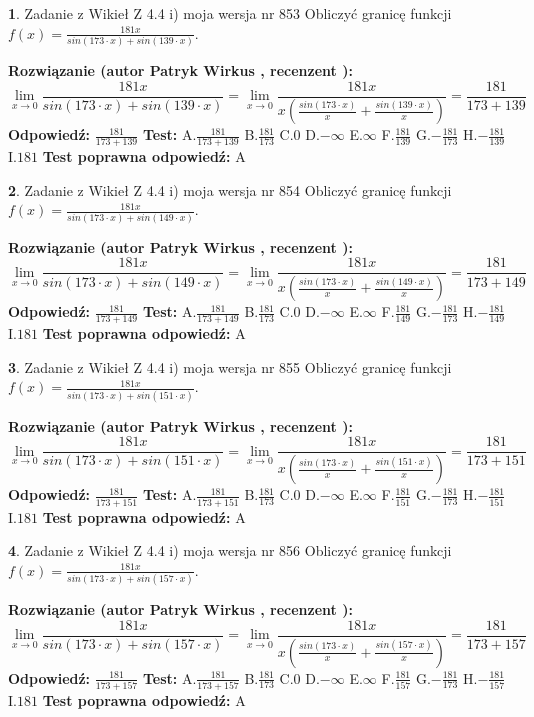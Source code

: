 \documentclass[12pt, a4paper]{article}
\theoremstyle{definition} %
\newtheorem{zad}{}
\newcommand{\zadStart}[1]{\begin{zad}#1\newline}
\newcommand{\zadStop}{\end{zad}}
\newcommand{\rozwStart}[2]{\noindent \textbf{Rozwiązanie (autor #1 , recenzent #2): }\newline}
\newcommand{\rozwStop}{\newline}
\newcommand{\odpStart}{\noindent \textbf{Odpowiedź:}\newline}
\newcommand{\odpStop}{\newline}
\newcommand{\testStart}{\noindent \textbf{Test:}\newline}
\newcommand{\testStop}{\newline}
\newcommand{\kluczStart}{\noindent \textbf{Test poprawna odpowiedź:}\newline}
\newcommand{\kluczStop}{\newline}
\begin{document}
\zadStart{Zadanie z Wikieł Z 4.4 i) moja wersja nr 853}
Obliczyć granicę funkcji $f(x)=\frac{181x}{sin(173\cdot x) +sin(139\cdot x)}$.
\zadStop
\rozwStart{Patryk Wirkus}{}
$$\lim\limits_{x\to 0}\frac{181x}{sin(173\cdot x) +sin(139\cdot x)}=\lim\limits_{x\to 0}\frac{181x}{x(\frac{sin(173\cdot x)}{x}+\frac{sin(139\cdot x)}{x})}=\frac{181}{173+139}$$
\rozwStop
\odpStart
$\frac{181}{173+139}$
\odpStop
\testStart
A.$\frac{181}{173+139}$
B.$\frac{181}{173}$
C.$0$
D.$-\infty$
E.$\infty$
F.$\frac{181}{139}$
G.$-\frac{181}{173}$
H.$-\frac{181}{139}$
I.$181$
\testStop
\kluczStart
A
\kluczStop



\zadStart{Zadanie z Wikieł Z 4.4 i) moja wersja nr 854}
Obliczyć granicę funkcji $f(x)=\frac{181x}{sin(173\cdot x) +sin(149\cdot x)}$.
\zadStop
\rozwStart{Patryk Wirkus}{}
$$\lim\limits_{x\to 0}\frac{181x}{sin(173\cdot x) +sin(149\cdot x)}=\lim\limits_{x\to 0}\frac{181x}{x(\frac{sin(173\cdot x)}{x}+\frac{sin(149\cdot x)}{x})}=\frac{181}{173+149}$$
\rozwStop
\odpStart
$\frac{181}{173+149}$
\odpStop
\testStart
A.$\frac{181}{173+149}$
B.$\frac{181}{173}$
C.$0$
D.$-\infty$
E.$\infty$
F.$\frac{181}{149}$
G.$-\frac{181}{173}$
H.$-\frac{181}{149}$
I.$181$
\testStop
\kluczStart
A
\kluczStop



\zadStart{Zadanie z Wikieł Z 4.4 i) moja wersja nr 855}
Obliczyć granicę funkcji $f(x)=\frac{181x}{sin(173\cdot x) +sin(151\cdot x)}$.
\zadStop
\rozwStart{Patryk Wirkus}{}
$$\lim\limits_{x\to 0}\frac{181x}{sin(173\cdot x) +sin(151\cdot x)}=\lim\limits_{x\to 0}\frac{181x}{x(\frac{sin(173\cdot x)}{x}+\frac{sin(151\cdot x)}{x})}=\frac{181}{173+151}$$
\rozwStop
\odpStart
$\frac{181}{173+151}$
\odpStop
\testStart
A.$\frac{181}{173+151}$
B.$\frac{181}{173}$
C.$0$
D.$-\infty$
E.$\infty$
F.$\frac{181}{151}$
G.$-\frac{181}{173}$
H.$-\frac{181}{151}$
I.$181$
\testStop
\kluczStart
A
\kluczStop



\zadStart{Zadanie z Wikieł Z 4.4 i) moja wersja nr 856}
Obliczyć granicę funkcji $f(x)=\frac{181x}{sin(173\cdot x) +sin(157\cdot x)}$.
\zadStop
\rozwStart{Patryk Wirkus}{}
$$\lim\limits_{x\to 0}\frac{181x}{sin(173\cdot x) +sin(157\cdot x)}=\lim\limits_{x\to 0}\frac{181x}{x(\frac{sin(173\cdot x)}{x}+\frac{sin(157\cdot x)}{x})}=\frac{181}{173+157}$$
\rozwStop
\odpStart
$\frac{181}{173+157}$
\odpStop
\testStart
A.$\frac{181}{173+157}$
B.$\frac{181}{173}$
C.$0$
D.$-\infty$
E.$\infty$
F.$\frac{181}{157}$
G.$-\frac{181}{173}$
H.$-\frac{181}{157}$
I.$181$
\testStop
\kluczStart
A
\kluczStop
\end{document}
